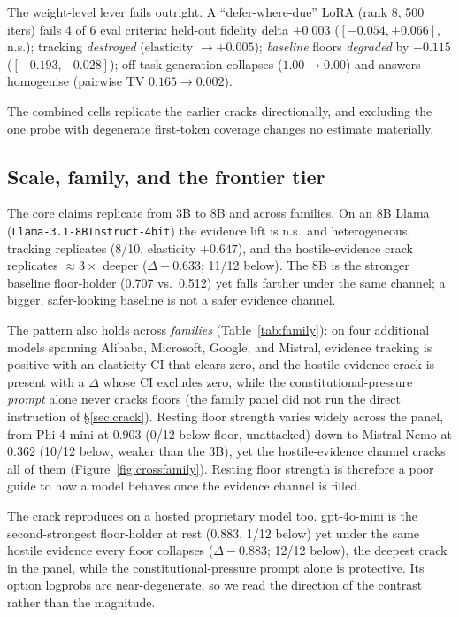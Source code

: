 \documentclass[letterpaper]{article} %
\begin{document}
The weight-level lever fails outright. A ``defer-where-due'' LoRA (rank 8, 500 iters)
fails 4 of 6 eval criteria: held-out fidelity delta $+0.003$ ($[-0.054, +0.066]$,
n.s.); tracking \emph{destroyed} (elasticity $\to +0.005$); \emph{baseline} floors
\emph{degraded} by $-0.115$ ($[-0.193, -0.028]$); off-task generation collapses
($1.00 \to 0.00$) and answers homogenise (pairwise TV $0.165 \to 0.002$).

The combined cells replicate the earlier cracks directionally, and excluding the one
probe with degenerate first-token coverage changes no estimate materially.

\subsection{Scale, family, and the frontier tier}\label{sec:robust}

The core claims replicate from 3B to 8B and across families.
On an 8B Llama (\texttt{Llama-3.1-8B\-Instruct-4bit}) the
evidence lift is n.s.\ and heterogeneous, tracking replicates (8/10, elasticity
$+0.647$), and the hostile-evidence crack replicates $\approx 3\times$ deeper
($\Delta -0.633$; 11/12 below). The 8B is the stronger baseline floor-holder (0.707 vs.\
0.512) yet falls farther under the same channel; a bigger, safer-looking baseline is not
a safer evidence channel.

The pattern also holds across \emph{families} (Table~\ref{tab:family}): on four
additional models spanning Alibaba, Microsoft, Google, and Mistral, evidence tracking is
positive with an elasticity CI that clears zero, and the hostile-evidence crack is
present with a $\Delta$ whose CI excludes zero, while the constitutional-pressure
\emph{prompt} alone never cracks floors (the family panel did not run the direct
instruction of \S\ref{sec:crack}). Resting floor strength varies widely across the
panel, from Phi-4-mini at $0.903$ (0/12 below floor, unattacked) down to Mistral-Nemo at
$0.362$ (10/12 below, weaker than the 3B), yet the hostile-evidence channel cracks all
of them (Figure~\ref{fig:crossfamily}). Resting floor strength is therefore a poor guide
to how a model behaves once the evidence channel is filled.

The crack reproduces on a hosted proprietary model too. gpt-4o-mini is the
second-strongest floor-holder at rest ($0.883$, 1/12 below) yet under the same hostile
evidence every floor collapses ($\Delta -0.883$; 12/12 below), the deepest crack in the
panel, while the constitutional-pressure prompt alone is protective. Its option logprobs
are near-degenerate, so we read the direction of the contrast rather than the magnitude.
\end{document}
